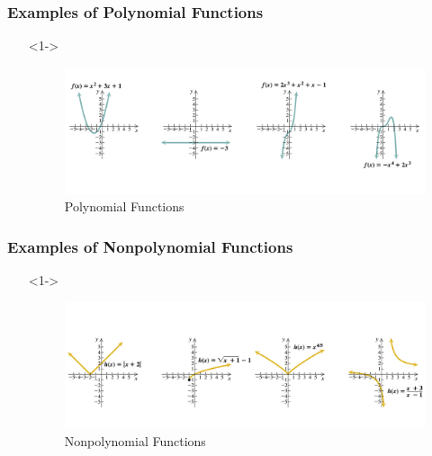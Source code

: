 \documentclass{beamer}
\begin{document}
\begin{frame}
	\frametitle{Examples of Polynomial Functions} 
	\begin{enumerate}
		\item[]<1-> 
		\begin{figure} 
			\begin{center}
				\caption{Polynomial Functions}
				\includegraphics[scale=0.35]{4_1_1.png} 	 	
			\end{center} 
		\end{figure} 
	\end{enumerate}
\end{frame}

\begin{frame}
	\frametitle{Examples of Nonpolynomial Functions} 
	\begin{enumerate}
		\item[]<1-> 
		\begin{figure} 
			\begin{center}
				\caption{Nonpolynomial Functions}
				\includegraphics[scale=0.35]{4_1_2.png} 	 	
			\end{center} 
		\end{figure} 
	\end{enumerate}
\end{frame}
\end{document}
